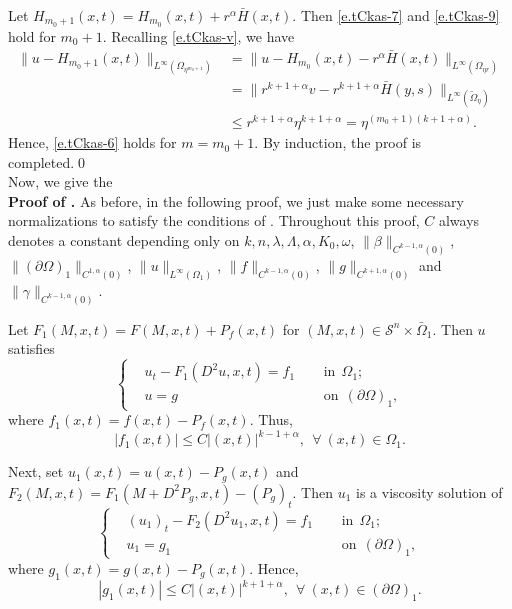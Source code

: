 \documentclass[preprint,12pt]{elsarticle}
\theoremstyle{definition}
\theoremstyle{remark}
\numberwithin{equation}{section}
\begin{document}
Let $H_{m_0+1}(x,t)=H_{m_0}(x,t)+r^{\alpha}\bar{H}(x,t)$. Then \cref{e.tCkas-7} and \cref{e.tCkas-9} hold for $m_0+1$. Recalling \cref{e.tCkas-v}, we have
\begin{equation*}
  \begin{aligned}
\|u-H_{m_0+1}(x,t)\|_{L^{\infty}(\Omega_{\eta^{m_0+1}})}&= \|u-H_{m_0}(x,t)-r^{\alpha}\bar{H}(x,t)\|_{L^{\infty}(\Omega_{\eta r})}\\
&= \|r^{k+1+\alpha}v-r^{k+1+\alpha}\bar{H}(y,s)\|_{L^{\infty}(\tilde{\Omega}_{\eta})}\\
&\leq r^{k+1+\alpha}\eta^{k+1+\alpha}=\eta^{(m_0+1)(k+1+\alpha)}.
  \end{aligned}
\end{equation*}
Hence, \cref{e.tCkas-6} holds for $m=m_0+1$. By induction, the proof is completed.\qed~\\

Now, we give the~\\
\noindent\textbf{Proof of .} As before, in the following proof,  we just make some necessary normalizations to satisfy the conditions of . Throughout this proof, $C$ always denotes a constant depending only on $k,n,\lambda, \Lambda,\alpha,K_0,\omega$, $\|\beta\|_{C^{k-1,\alpha}(0)}$, $\|(\partial \Omega)_1\|_{C^{1,\alpha}(0)}$, $\|u\|_{L^{\infty}(\Omega_1)}$, $\|f\|_{C^{k-1,\alpha}(0)}$, $\|g\|_{C^{k+1,\alpha}(0)}$  and $\|\gamma\|_{C^{k-1,\alpha}(0)}$.

Let $F_1(M,x,t)=F(M,x,t)+P_f(x,t)$ for $(M,x,t)\in \mathcal {S}^{n}\times \bar{\Omega}_1$. Then $u$ satisfies
\begin{equation*}
\left\{\begin{aligned}
&u_t-F_1(D^2u,x,t)=f_1&& ~~\mbox{in}~~\Omega_1;\\
&u=g&& ~~\mbox{on}~~(\partial \Omega)_1,
\end{aligned}\right.
\end{equation*}
where $f_1(x,t)=f(x,t)-P_f(x,t)$. Thus,
\begin{equation*}
  |f_1(x,t)|\leq C|(x,t)|^{k-1+\alpha}, ~~\forall ~(x,t)\in \Omega_1.
\end{equation*}

Next, set $u_1(x,t)=u(x,t)-P_g(x,t)$ and $F_2(M,x,t)=F_1(M+D^2P_g,x,t)-(P_g)_t$. Then $u_1$ is a viscosity solution of
\begin{equation*}
\left\{\begin{aligned}
&(u_1)_t-F_2(D^2u_1,x,t)=f_1&& ~~\mbox{in}~~\Omega_1;\\
&u_1=g_1&& ~~\mbox{on}~~(\partial \Omega)_1,
\end{aligned}\right.
\end{equation*}
where $g_1(x,t)=g(x,t)-P_g(x,t)$. Hence,
\begin{equation}\label{e.cka.g}
  |g_1(x,t)|\leq C|(x,t)|^{k+1+\alpha}, ~~\forall ~(x,t)\in (\partial \Omega)_1.
\end{equation}
\end{document}
